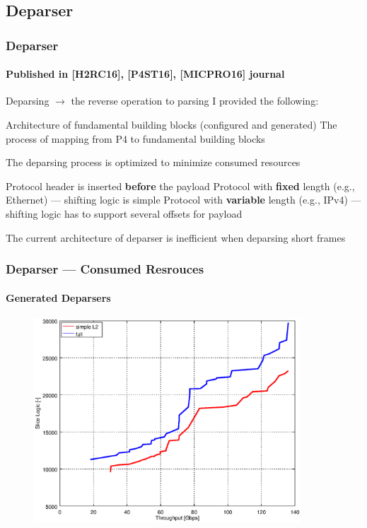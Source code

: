 \subsection*{Deparser}
\begin{frame}
    \frametitle{Deparser}
    \framesubtitle{Published in [H2RC16], [P4ST16], [MICPRO16] journal}
    \begin{itemize}
        \fitem Deparsing $\rightarrow$ the reverse operation to parsing
        \fitem I provided the following:
        \begin{itemize}
            \fitem Architecture of fundamental building blocks (configured and generated)
            \fitem The process of mapping from P4 to fundamental building blocks
        \end{itemize}
        
        \fitem The deparsing process is optimized to minimize consumed resources
        \begin{itemize}
            \fitem Protocol header is inserted \textbf{before} the payload
            \fitem Protocol with \textbf{fixed} length (e.g., Ethernet) --- shifting logic is simple
            \fitem Protocol with \textbf{variable} length (e.g., IPv4) --- shifting logic has to support several offsets for payload
        \end{itemize}
        
        \fitem The current architecture of deparser is inefficient when deparsing short frames 
    \end{itemize}
\end{frame}

\begin{frame}
    \frametitle{Deparser --- Consumed Resrouces}
    \framesubtitle{Generated Deparsers}
    
    \begin{figure}[t]
        \centering
        \includegraphics[width=0.89\textwidth]{pic/graph/deparser/1_thr_slice_logic_pareto}
    \end{figure}
\end{frame}

